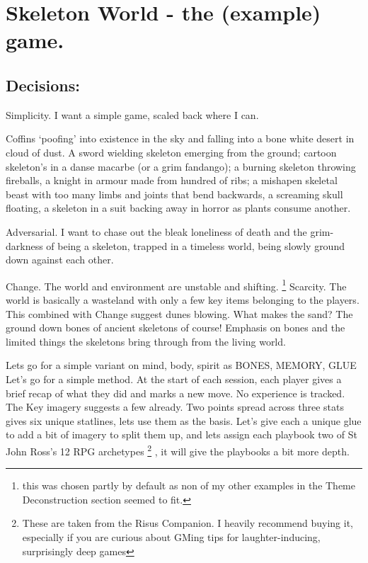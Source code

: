 
\section{Skeleton World - the (example) game.}



\subsection{Decisions:}

 Simplicity. I want a simple game, scaled back where I can. 

 Coffins `poofing' into existence in the sky and falling into a bone white desert in cloud of dust. A sword wielding skeleton emerging from the ground; cartoon skeleton's in a danse macarbe (or a grim fandango); a burning skeleton throwing fireballs, a knight in armour made from hundred of ribs; a mishapen skeletal beast with too many limbs and joints that bend backwards, a screaming skull floating, a skeleton in a suit backing away in horror as plants consume another.

 Adversarial. I want to chase out the bleak loneliness of death and the grim-darkness of being a skeleton, trapped in a timeless world, being slowly ground down against each other.  

 Change. The world and environment are unstable and shifting. \footnote{this was chosen partly by default as non of my other examples in the Theme Deconstruction section seemed to fit.}
 Scarcity. The world is basically a wasteland with only a few key items belonging to the players. This combined with Change suggest dunes blowing. What makes the sand? The ground down bones of ancient skeletons of course!
 Emphasis on bones and the limited things the skeletons bring through from the living world.

 Lets go for a simple variant on mind, body, spirit as BONES, MEMORY, GLUE
 Let's go for a simple method. At the start of each session, each player gives a brief recap of what they did and marks a new move. No experience is tracked.
 The Key imagery suggests a few already. Two points spread across three stats gives six unique statlines, lets use them as the basis. Let's give each a unique glue to add a bit of imagery to split them up, and lets assign each playbook two of St John Ross's 12 RPG archetypes
\footnote{These are taken from the Risus Companion. I heavily recommend buying it, especially if you are curious about GMing tips for laughter-inducing, surprisingly deep games}
, it will give the playbooks a bit more depth.


